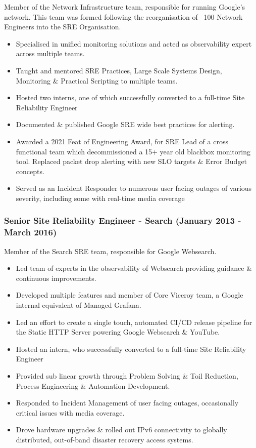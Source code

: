 \documentclass[a4paper, 10pt] {article}
\begin{document}
Member of the Network Infrastructure team, responsible for running
Google's network. This team was formed following the reorganisation of
~100 Network Engineers into the SRE Organisation.

\begin{itemize}[noitemsep]
	\item Specialised in unified monitoring solutions and acted as observability expert across multiple teams.
	\item Taught and mentored SRE Practices, Large Scale Systems Design, Monitoring \& Practical Scripting to multiple teams.
 	\item Hosted two interns, one of which successfully converted to a full-time Site Reliability Engineer
	\item Documented \& published Google SRE wide best practices for alerting.
	\item Awarded a 2021 Feat of Engineering Award, for SRE Lead of a cross functional team which decommissioned a 15+ year old blackbox
		monitoring tool. Replaced packet drop alerting with new SLO targets \& Error Budget concepts.
	\item Served as an Incident Responder to numerous user facing outages of various severity, including some with real-time media coverage
\end{itemize}

\newpage %

\subsubsection*{Senior Site Reliability Engineer - Search (January 2013 - March 2016)}

Member of the Search SRE team, responsible for Google Websearch.

\begin{itemize}[noitemsep]
	\item Led team of experts in the observability of Websearch providing guidance \& continuous improvements.
	\item Developed multiple features and member of Core Viceroy team, a Google internal equivalent of Managed Grafana.
  	\item Led an effort to create a single touch, automated CI/CD release pipeline for the Static HTTP Server powering Google Websearch \& YouTube.
   	\item Hosted an intern, who successfully converted to a full-time Site Reliability Engineer
	\item Provided sub linear growth through Problem Solving \& Toil Reduction, Process Engineering \& Automation Development.
	\item Responded to Incident Management of user facing outages, occasionally critical issues with media coverage.
 	\item Drove hardware upgrades \& rolled out IPv6 connectivity to globally distributed, out-of-band disaster recovery access systems.
\end{itemize}
\end{document}
